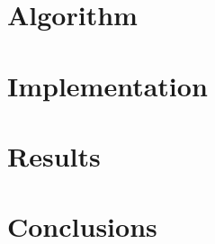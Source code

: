 \section{Algorithm}
\graphicspath{{./figsAlgo/}}


\section{Implementation}
\graphicspath{{./figsImpl/}}


\section{Results}
\graphicspath{{./figsResults/}}


\section{Conclusions}







